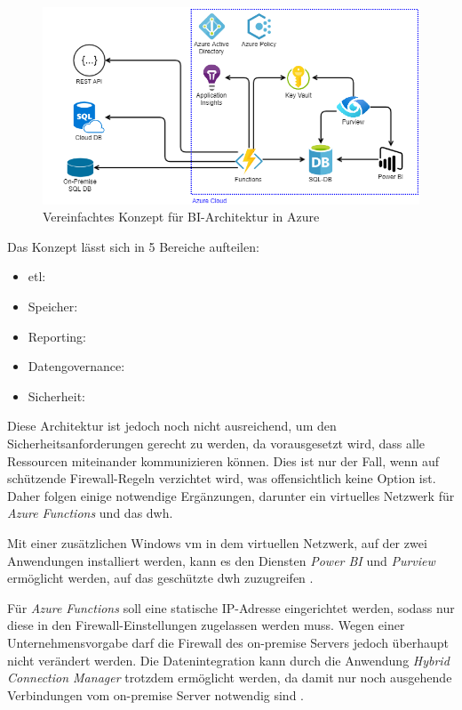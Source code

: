 \begin{figure}[htbp]
 \centering
 \includegraphics[width=\textwidth]{gfx/konzept_1.png}
 \caption{Vereinfachtes Konzept für BI-Architektur in Azure}
\label{fig:chap03_4_konzeptArchitektur_offen}
\end{figure}

Das Konzept lässt sich in 5 Bereiche aufteilen:
\begin{itemize}
\item \ac{etl}:
\item Speicher:
\item Reporting:
\item Datengovernance:
\item Sicherheit: 
\end{itemize}

Diese Architektur ist jedoch noch nicht ausreichend, um den Sicherheitsanforderungen gerecht zu werden, da vorausgesetzt wird, dass alle Ressourcen miteinander kommunizieren können. Dies ist nur der Fall, wenn auf schützende Firewall-Regeln verzichtet wird, was offensichtlich keine Option ist. Daher folgen einige notwendige Ergänzungen, darunter ein virtuelles Netzwerk für \textit{Azure Functions} und das \ac{dwh}. 

Mit einer zusätzlichen Windows \ac{vm} in dem virtuellen Netzwerk, auf der zwei Anwendungen installiert werden, kann es den Diensten \textit{Power BI} und \textit{Purview} ermöglicht werden, auf das geschützte \ac{dwh} zuzugreifen \cite[vgl.][]{gunnarsson_pro_2020, msdoc_22_purviewSHIR}.

Für \textit{Azure Functions} soll eine statische IP-Adresse eingerichtet werden, sodass nur diese in den Firewall-Einstellungen zugelassen werden muss. Wegen einer Unternehmensvorgabe darf die Firewall des on-premise Servers jedoch überhaupt nicht verändert werden. Die Datenintegration kann durch die Anwendung \textit{Hybrid Connection Manager} trotzdem ermöglicht werden, da damit nur noch ausgehende Verbindungen vom on-premise Server notwendig sind \cite[vgl.][]{msdoc_22_func_hybridConn}. 

